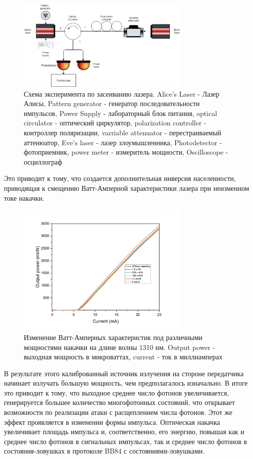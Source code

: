 \begin{figure}
    \centering
    \includegraphics[width=0.75\textwidth]{images/1310 experiment.png}
    \caption{Схема эксперимента по засеиванию лазера. Alice's Laser -  Лазер Алисы, Pattern generator - генератор последовательности импульсов, Power Supply - лабораторный блок питания, optical circulator - оптический циркулятор, polarization controller - контроллер поляризации, varriable attenuator - перестраиваемый аттенюатор, Eve's laser - лазер злоумышленника, Photodetector - фотоприемник, power meter - измеритель мощности, Oscilloscope - осциллограф}
    \label{fig:exper 1310 ref}
\end{figure}
Это приводит к тому, что создается дополнительная инверсия населенности, приводящая к смещению Ватт-Амперной характеристики лазера при неизменном токе накачки.
\begin{figure}
    \centering
    \includegraphics[width=0.75\textwidth]{images/ватт ампер для диссера.png}
    \caption{Изменение Ватт-Амперных характеристик под различными мощностями накачки на длине волны 1310 нм. Output power - выходная мощность в микроваттах, current - ток в миллиамперах}
    \label{fig:watt-amp ref}
\end{figure}
В результате этого калиброванный источник излучения на стороне передатчика начинает излучать большую мощность, чем предполагалось изначально. В итоге это приводит к тому, что выходное среднее число фотонов увеличивается, генерируется большее количество многофотонных состояний, что открывает возможности по реализации атаки с расщеплением числа фотонов. Этот же эффект проявляется в изменении формы импульса. Оптическая накачка увеличивает площадь импульса и, соответственно, его энергию, повышая как и среднее число фотонов в сигнальных импульсах, так и среднее число фотонов в состояния-ловушках в протоколе BB84 с состояниями-ловушками.
